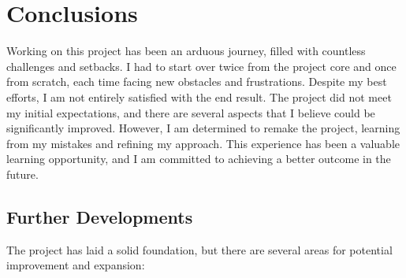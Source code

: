 \documentclass[12pt]{article}
\begin{document}


	\section{Conclusions}
	
	Working on this project has been an arduous journey, filled with countless challenges and setbacks. I had to start over twice from the project core and once from scratch, each time facing new obstacles and frustrations. Despite my best efforts, I am not entirely satisfied with the end result. The project did not meet my initial expectations, and there are several aspects that I believe could be significantly improved. However, I am determined to remake the project, learning from my mistakes and refining my approach. This experience has been a valuable learning opportunity, and I am committed to achieving a better outcome in the future.
	
	
	\subsection{Further Developments}
	The project has laid a solid foundation, but there are several areas for potential improvement and expansion:
	
\end{document}

